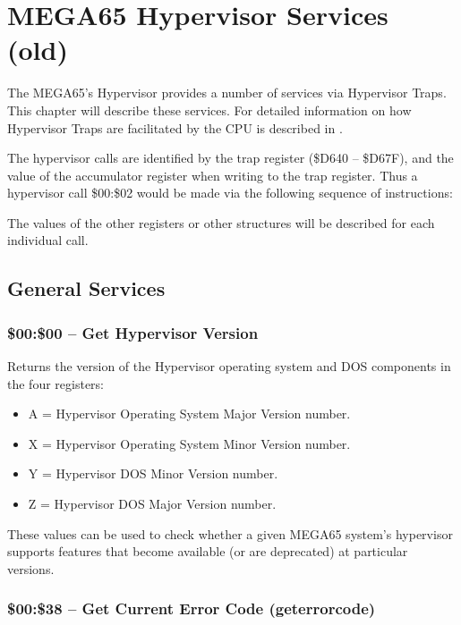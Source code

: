 \chapter{MEGA65 Hypervisor Services (old)}

The MEGA65's Hypervisor provides a number of services via Hypervisor Traps.
This chapter will describe these services.  For detailed information on how
Hypervisor Traps are facilitated by the CPU is described in .

The hypervisor calls are identified by the trap register (\$D640 -- \$D67F), and
the value of the accumulator register when writing to the trap register.  Thus
a hypervisor call \$00:\$02 would be made via the following sequence of instructions:


The values of the other registers or other structures will be described for
each individual call.

\section{General Services}

\subsection{\$00:\$00 -- Get Hypervisor Version}

Returns the version of the Hypervisor operating system and DOS components in the
four registers:

\begin{itemize}
  \item A = Hypervisor Operating System Major Version number. 
  \item X = Hypervisor Operating System Minor Version number. 
  \item Y = Hypervisor DOS Minor Version number. 
  \item Z = Hypervisor DOS Major Version number. 
\end{itemize}

These values can be used to check whether a given MEGA65 system's hypervisor
supports features that become available (or are deprecated) at particular versions.

\subsection{\$00:\$38 -- Get Current Error Code (geterrorcode)}

